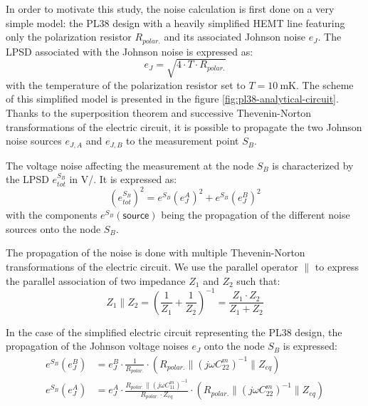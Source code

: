 In order to motivate this study, the noise calculation is first done on a very simple model: the PL38 design with a heavily simplified HEMT line featuring only the polarization resistor $R_{polar.}$ and its associated Johnson noise $e_J$. The LPSD associated with the Johnson noise is expressed as:
\begin{equation}
e_J = \sqrt{4 \cdot T \cdot R_{polar.}}
\end{equation}
with the temperature of the polarization resistor set to $T=\SI{10}{\milli\kelvin}$. The scheme of this simplified model is presented in the figure \ref{fig:pl38-analytical-circuit}. Thanks to the superposition theorem and successive Thevenin-Norton transformations of the electric circuit, it is possible to propagate the two Johnson noise sources $e_{J,A}$ and $e_{J,B}$ to the measurement point $S_B$. 

The voltage noise affecting the measurement at the node $S_B$ is characterized by the LPSD $e_{tot}^{S_B}$ in \si[per-mode=symbol]{\volt\per\sqrthz}. It is expressed as:
\begin{equation}
\left( e_{tot}^{S_B} \right)^2
=
e^{S_B} \left( e_J^A \right)^2
+
e^{S_B} \left( e_J^B \right)^2
\end{equation}
with the components $e^{S_B} (\textsf{source})$ being the propagation of the different noise sources onto the node $S_B$.

The propagation of the noise is done with multiple Thevenin-Norton transformations of the electric circuit. We use the parallel operator $\parallel$ to express the parallel association of two impedance $Z_1$ and $Z_2$ such that:
\begin{equation}
Z_1 \parallel Z_2 = \left( \frac{1}{Z_1} + \frac{1}{Z_2} \right)^{-1} = \frac{Z_1 \cdot Z_2}{Z_1 + Z_2}
\end{equation}

In the case of the simplified electric circuit representing the PL38 design, the propagation of the Johnson voltage noises $e_J$ onto the node $S_B$ is expressed:
\begin{align}
e^{S_B} \left( e_J^B \right)
&=
e_J^B
\cdot 
\frac{1}{R_{polar.}}
\cdot
\left( R_{polar.} \parallel (j\omega C_{22}^m)^{-1} \parallel Z_{eq} \right)
\\
e^{S_B} \left( e_J^A \right)
&=
e_J^A
\cdot
\frac{R_{polar.} \parallel (j\omega C_{11}^m)^{-1} }{R_{polar.} \cdot Z_{eq}}
\cdot
\left( R_{polar.} \parallel (j\omega C_{22}^m)^{-1} \parallel Z_{eq} \right)
\end{align}


